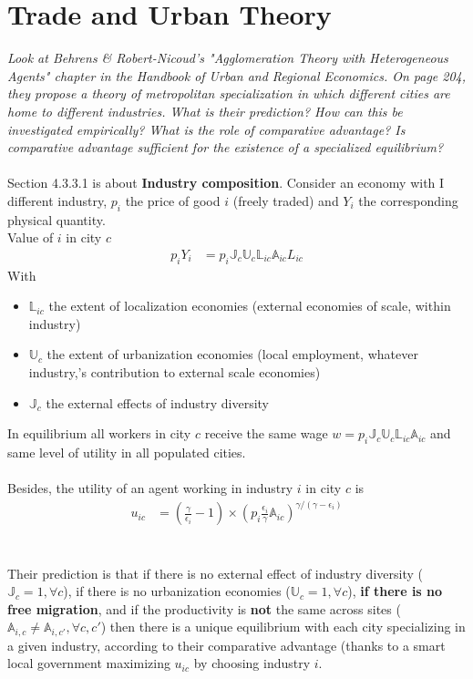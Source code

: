 \documentclass[10pt, final]{article}
\begin{document}
\newpage

\section{Trade and Urban Theory} %
\label{sec:trade_and_urban_theory}

\textit{Look at Behrens \& Robert-Nicoud's "Agglomeration Theory with Heterogeneous Agents" chapter in the Handbook of Urban and Regional Economics. On page 204, they propose a theory of metropolitan specialization in which different cities are home to different industries. What is their prediction? How can this be investigated empirically? What is the role of comparative advantage? Is comparative advantage sufficient for the existence of a specialized equilibrium?}
\\
\\
Section 4.3.3.1 is about \textbf{Industry composition}. Consider an economy with I different industry, $p_i$ the price of good $i$ (freely traded) and $Y_i$ the corresponding physical quantity. \\
Value of $i$ in city $c$
\begin{align*}
    p_i Y_i &= p_i \mathbb{J}_c \mathbb{U}_c \mathbb{L}_{ic} \mathbb{A}_{ic} L_{ic}
\end{align*}
With 
\begin{itemize}
    \item $\mathbb{L}_{ic}$ the extent of localization economies (external economies of scale, within industry)
    \item $\mathbb{U}_c$ the extent of urbanization economies (local employment, whatever industry,'s contribution to external scale economies)
    \item $\mathbb{J}_c$ the external effects of industry diversity
\end{itemize}
In equilibrium all workers in city $c$ receive the same wage  $w = p_i \mathbb{J}_c \mathbb{U}_c \mathbb{L}_{ic} \mathbb{A}_{ic}$ and same level of utility in all populated cities.
\\
\\
Besides, the utility of an agent working in industry $i$ in city $c$ is
\begin{align*}
    u_{ic} &= (\frac{\gamma}{\epsilon_i} - 1) \times (p_i \frac{\epsilon_i}{\gamma} \mathbb{A}_{ic})^{\gamma / (\gamma - \epsilon_i)}
\end{align*}
\\
\\
Their prediction is that if there is no external effect of industry diversity ($\mathbb{J}_c = 1, \forall c$), if there is no urbanization economies ($\mathbb{U}_c = 1, \forall c$), \textbf{if there is no free migration}, and if the productivity is \textbf{not }the same across sites ($\mathbb{A}_{i,c} \neq \mathbb{A}_{i,c'}, \forall c,c'$) then there is a unique equilibrium with each city specializing in a given industry, according to their comparative advantage (thanks to a smart local government maximizing $u_{ic}$ by choosing industry $i$.
\end{document}
